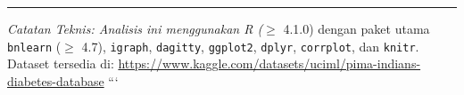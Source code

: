 \documentclass[
  11pt,
]{article}
\begin{document}
\begin{center}\rule{0.5\linewidth}{0.5pt}\end{center}

\emph{Catatan Teknis: Analisis ini menggunakan R (}\(\geq\) 4.1.0)
dengan paket utama \texttt{bnlearn} (\(\geq\) 4.7), \texttt{igraph},
\texttt{dagitty}, \texttt{ggplot2}, \texttt{dplyr}, \texttt{corrplot},
dan \texttt{knitr}. Dataset tersedia di:
\url{https://www.kaggle.com/datasets/uciml/pima-indians-diabetes-database}
```
\end{document}
